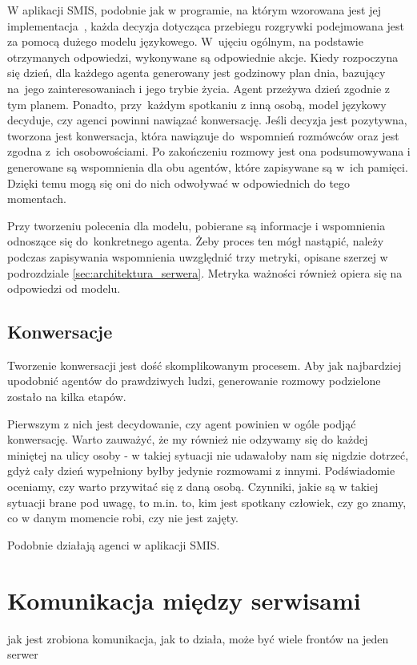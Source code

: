 W aplikacji SMIS, podobnie jak w programie, na którym wzorowana jest jej implementacja~\cite{park2023generativeagentsinteractivesimulacra}, każda decyzja dotycząca przebiegu rozgrywki podejmowana jest za pomocą dużego modelu językowego. W~ujęciu ogólnym, na podstawie otrzymanych odpowiedzi, wykonywane są odpowiednie akcje. Kiedy rozpoczyna się dzień, dla każdego agenta generowany jest godzinowy plan dnia, bazujący na~jego zainteresowaniach i jego trybie życia. Agent przeżywa dzień zgodnie z tym planem. Ponadto, przy~każdym spotkaniu z inną osobą, model językowy decyduje, czy agenci powinni nawiązać konwersację. Jeśli decyzja jest pozytywna, tworzona jest konwersacja, która nawiązuje do~wspomnień rozmówców oraz jest zgodna z~ich osobowościami. Po zakończeniu rozmowy jest ona podsumowywana i generowane są wspomnienia dla obu agentów, które zapisywane są w~ich pamięci. Dzięki temu mogą się oni do nich odwoływać w odpowiednich do tego momentach.

Przy tworzeniu polecenia dla modelu, pobierane są informacje i wspomnienia odnoszące się do~konkretnego agenta. Żeby proces ten mógł nastąpić, należy podczas zapisywania wspomnienia uwzględnić trzy metryki, opisane szerzej w podrozdziale \ref{sec:architektura_serwera}. Metryka ważności również opiera się na odpowiedzi od modelu.

\subsection{Konwersacje}

Tworzenie konwersacji jest dość skomplikowanym procesem. Aby jak najbardziej upodobnić agentów do prawdziwych ludzi, generowanie rozmowy podzielone zostało na kilka etapów.

Pierwszym z nich jest decydowanie, czy agent powinien w ogóle podjąć konwersację. Warto zauważyć, że my również nie odzywamy się do każdej miniętej na ulicy osoby - w takiej sytuacji nie udawałoby nam się nigdzie dotrzeć, gdyż cały dzień wypełniony byłby jedynie rozmowami z innymi. Podświadomie oceniamy, czy warto przywitać się z daną osobą. Czynniki, jakie są w takiej sytuacji brane pod uwagę, to m.in. to, kim jest spotkany człowiek, czy go znamy, co w danym momencie robi, czy nie jest zajęty.

Podobnie działają agenci w aplikacji SMIS.




\section{Komunikacja między serwisami}

jak jest zrobiona komunikacja, jak to działa, może być wiele frontów na jeden serwer
